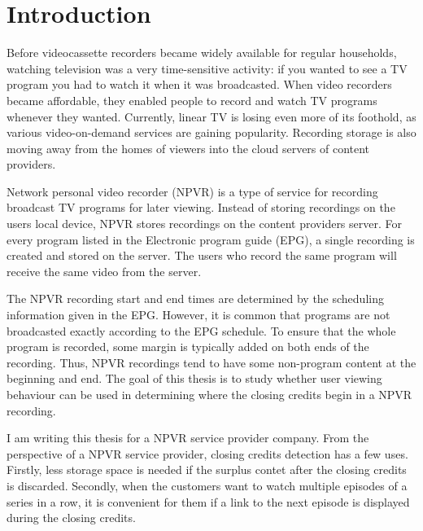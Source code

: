 \section{Introduction} \label{sec:intro}

Before videocassette recorders became widely available for regular households, watching television was a very time-sensitive activity: if you wanted to see a TV program you had to watch it when it was broadcasted. When video recorders became affordable, they enabled people to record and watch TV programs whenever they wanted. Currently, linear TV is losing even more of its foothold, as various video-on-demand services are gaining popularity. %
Recording storage is also moving away from the homes of viewers into the cloud servers of content providers.

Network personal video recorder (NPVR) is a type of service for recording broadcast TV programs for later viewing. Instead of storing recordings on the users local device, NPVR stores recordings on the content providers server. For every program listed in the Electronic program guide (EPG), a single recording is created and stored on the server. The users who record the same program will receive the same video from the server.

The NPVR recording start and end times are determined by the scheduling information given in the EPG. However, it is common that programs are not broadcasted exactly according to the EPG schedule. To ensure that the whole program is recorded, some margin is typically added on both ends of the recording. Thus, NPVR recordings tend to have some non-program content at the beginning and end. The goal of this thesis is to study whether user viewing behaviour can be used in determining where the closing credits begin in a NPVR recording.

I am writing this thesis for a  NPVR service provider company. From the perspective of a NPVR service provider, closing credits detection has a few uses. Firstly, less storage space is needed if the surplus contet after the closing credits is discarded. Secondly, when the customers want to watch multiple episodes of a series in a row, it is convenient for them if a link to the next episode is displayed during the closing credits.


